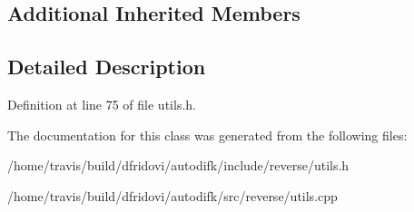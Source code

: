 \subsection*{Additional Inherited Members}


\subsection{Detailed Description}


Definition at line 75 of file utils.\-h.



The documentation for this class was generated from the following files\-:\begin{DoxyCompactItemize}
\item 
/home/travis/build/dfridovi/autodifk/include/reverse/utils.\-h\item 
/home/travis/build/dfridovi/autodifk/src/reverse/utils.\-cpp\end{DoxyCompactItemize}
